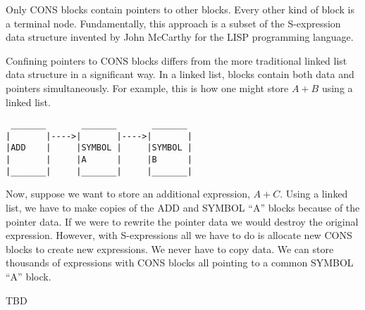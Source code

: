 \medskip
\noindent
Only CONS blocks contain pointers to other blocks.
Every other kind of block is a terminal node.
Fundamentally, this approach is a subset of the S-expression data structure
invented by John McCarthy for the LISP programming language.

\newpage

\noindent
Confining pointers to CONS blocks differs from the more traditional linked
list data structure in a significant way.
In a linked list, blocks contain both data and pointers simultaneously.
For example, this is how one might store $A+B$ using a linked list.

\begin{verbatim}
 _______       _______       _______
|       |---->|       |---->|       |
|ADD    |     |SYMBOL |     |SYMBOL |
|       |     |A      |     |B      |
|_______|     |_______|     |_______|
\end{verbatim}

\medskip
\noindent
Now, suppose we want to store an additional expression, $A+C$.
Using a linked list, we have to make copies of the ADD and SYMBOL ``A'' blocks
because of the pointer data.
If we were to rewrite the pointer data we would destroy the original
expression.
However, with S-expressions all we have to do is allocate new CONS
blocks to create new expressions.
We never have to copy data.
We can store thousands of expressions with CONS
blocks all pointing to a common SYMBOL ``A'' block.

\medskip
\noindent
TBD

